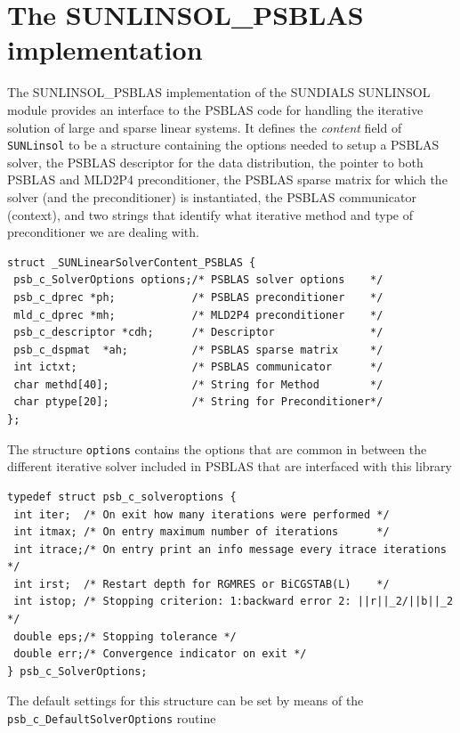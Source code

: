 \documentclass[twoside,a4paper]{refart}
\theoremstyle{definition}
\begin{document}
\section{The SUNLINSOL\_PSBLAS implementation}\label{sec:sunlinsol}
	The SUNLINSOL\_PSBLAS implementation of the SUNDIALS SUNLINSOL module provides an interface to the PSBLAS code for handling the iterative solution of large and sparse linear systems. It defines the \emph{content} field of \texttt{SUNLinsol} to be a structure containing the options needed to setup a PSBLAS solver, the PSBLAS descriptor for the data distribution, the pointer to both PSBLAS and MLD2P4 preconditioner, the PSBLAS sparse matrix for which the solver (and the preconditioner) is instantiated, the PSBLAS communicator (context), and two strings that identify what iterative method and type of preconditioner we are dealing with.
\begin{lstlisting}[style=CStyle]
struct _SUNLinearSolverContent_PSBLAS {
 psb_c_SolverOptions options;/* PSBLAS solver options    */
 psb_c_dprec *ph;            /* PSBLAS preconditioner    */
 mld_c_dprec *mh;            /* MLD2P4 preconditioner    */
 psb_c_descriptor *cdh;      /* Descriptor               */
 psb_c_dspmat  *ah;          /* PSBLAS sparse matrix     */
 int ictxt;                  /* PSBLAS communicator      */
 char methd[40];             /* String for Method        */
 char ptype[20];             /* String for Preconditioner*/
};
\end{lstlisting}

The structure \texttt{options} contains the options that are common in between the different iterative solver included in PSBLAS that are interfaced with this library
\begin{lstlisting}[style=CStyle]
typedef struct psb_c_solveroptions {
 int iter;  /* On exit how many iterations were performed */
 int itmax; /* On entry maximum number of iterations      */
 int itrace;/* On entry print an info message every itrace iterations */
 int irst;  /* Restart depth for RGMRES or BiCGSTAB(L)    */
 int istop; /* Stopping criterion: 1:backward error 2: ||r||_2/||b||_2 */
 double eps;/* Stopping tolerance */
 double err;/* Convergence indicator on exit */
} psb_c_SolverOptions;
\end{lstlisting}
The default settings for this structure can be set by means of the \lstinline[style=CStyle]|psb_c_DefaultSolverOptions| routine
\end{document}

